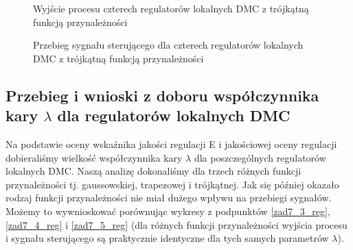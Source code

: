 \begin{figure}[t]
    \centering
    \caption{Wyjście procesu czterech regulatorów lokalnych DMC z trójkątną funkcją przynależności}
    \label{pro_zad7_DMC_triangle_4_out}
\end{figure}

\begin{figure}[b]
    \centering
    \caption{Przebieg sygnału sterującego dla czterech regulatorów lokalnych DMC z trójkątną  funkcją przynależności}
    \label{pro_zad7_DMC_triangle_4_inp}
\end{figure}
\FloatBarrier

\subsection{Przebieg i wnioski z doboru współczynnika kary $\lambda$ dla regulatorów lokalnych DMC}
Na podstawie oceny wskaźnika jakości regulacji E i jakościowej oceny regulacji dobieraliśmy wielkość współczynnika kary $\lambda$ dla poszczególnych regulatorów lokalnych DMC. Naszą analizę dokonaliśmy dla trzech różnych funkcji przynależności tj. gaussowskiej, trapezowej i trójkątnej. Jak się później okazało rodzaj funkcji przynależności nie miał dużego wpływu na przebiegi sygnałów. Możemy to wywnioskować porównując wykresy z podpunktów \ref{zad7_3_reg}, \ref{zad7_4_reg} i \ref{zad7_5_reg} (dla różnych funkcji przynależności wyjścia procesu i sygnału sterującego są praktycznie identyczne dla tych samych parametrów $\lambda$). 


